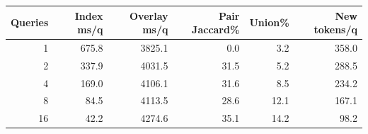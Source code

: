 \begin{tabular}{@{}rrrrrr@{}}
\toprule
Queries & Index ms/q & Overlay ms/q & Pair Jaccard\% & Union\% & New tokens/q \\
\midrule
1 & 675.8 & 3825.1 & 0.0 & 3.2 & 358.0 \\
2 & 337.9 & 4031.5 & 31.5 & 5.2 & 288.5 \\
4 & 169.0 & 4106.1 & 31.6 & 8.5 & 234.2 \\
8 & 84.5 & 4113.5 & 28.6 & 12.1 & 167.1 \\
16 & 42.2 & 4274.6 & 35.1 & 14.2 & 98.2 \\
\bottomrule
\end{tabular}
